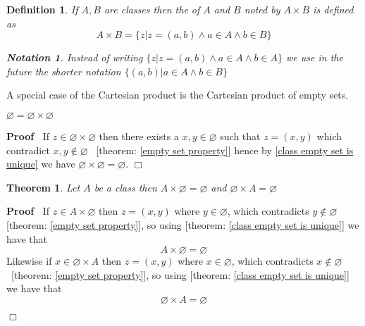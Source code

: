 \documentclass{book}
\newcommand{\nin}{\not\in}
\newcommand{\tmtextbf}[1]{\text{{\bfseries{#1}}}}
\newenvironment{proof}{\noindent\textbf{Proof\ }}{\hspace*{\fill}$\Box$\medskip}
\newtheorem{definition}{Definition}
{\theorembodyfont{\rmfamily}\newtheorem{example}{Example}}
\newtheorem{notation}{Notation}
{\theorembodyfont{\rmfamily}\newtheorem{note}{Note}}
\newtheorem{theorem}{Theorem}
\begin{document}
\begin{definition}
  \label{cartesian product}{}{}If
  $A, B$ are classes then the \tmtextbf{Cartesian product }of $A$ and $B$
  noted by $A \times B$ is defined as
  \[ A \times B = \{ z|z = (a, b) \wedge a \in A \wedge b \in B \} \]
  \begin{notation}
    Instead of writing $\{ z|z = (a, b) \wedge a \in A \wedge b \in A \}$ we
    use in the future the shorter notation $\{ (a, b) |a \in A \wedge b \in B
    \}$
  \end{notation}
\end{definition}

A special case of the Cartesian product is the Cartesian product of empty
sets.

\begin{example}
  \label{cartesian product of the empty set}$\varnothing = \varnothing \times
  \varnothing$
\end{example}

\begin{proof}
  If $z \in \varnothing \times \varnothing$ then there exists a $x, y \in
  \varnothing$ such that $z = (x, y)$ which contradict $x, y \nin \varnothing$
  \ [theorem: \ref{empty set property}] hence by \ref{class empty set is
  unique} we have $\varnothing \times \varnothing = \varnothing$.
\end{proof}

\begin{theorem}
  \label{cartesian product with enpty set}Let $A$ be a class then $A \times
  \varnothing = \varnothing$ and $\varnothing \times A = \varnothing$
\end{theorem}

\begin{proof}
  If $z \in A \times \varnothing$ then $z = (x, y)$ where $y \in \varnothing$,
  which contradicts $y \nin \varnothing$ [theorem: \ref{empty set property}],
  so using [theorem: \ref{class empty set is unique}] we have that
  \[ A \times \varnothing = \varnothing \]
  Likewise if $x \in \varnothing \times A$ then $z = (x, y)$ where $x \in
  \varnothing$, which contradicts $x \nin \varnothing$ \ [theorem: \ref{empty
  set property}], so using [theorem: \ref{class empty set is unique}] we have
  that
  \[ \varnothing \times A = \varnothing \]
  
\end{proof}
\end{document}
